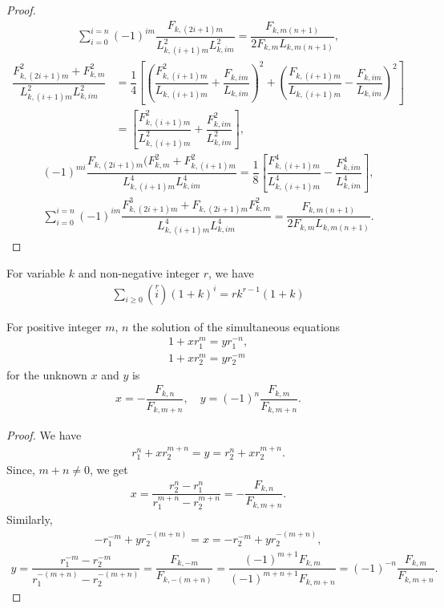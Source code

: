 \begin{proof}
\begin{align*}
   \sum_{i=0}^{i=n}(-1)^{im}\dfrac{F_{k,(2i+1)m}}{L_{k,(i+1)m}^2 L_{k,im}^2} = \dfrac{F_{k,m(n+1)}}{2F_{k,m}L_{k,m(n+1)}},
 \end{align*} 
\begin{align*}
\dfrac{F_{k,(2i+1)m}^2+F_{k,m}^2}{L_{k,(i+1)m}^2L_{k,im}^2} &= \dfrac{1}{4}\left[(\dfrac{F_{k,(i+1)m}^2}{L_{k,(i+1)m}} + \dfrac{F_{k,im}}{L_{k,im}})^2+(\dfrac{F_{k,(i+1)m}}{L_{k,(i+1)m}} - \dfrac{F_{k,im}}{L_{k,im}})^2  \right] 
\\&=\left[\dfrac{F_{k,(i+1)m}^2}{L_{k,(i+1)m}^2} + \dfrac{F_{k,im}^2}{L_{k,im}^2} \right],
\end{align*}
\begin{align*}
(-1)^{mi}\dfrac{F_{k,(2i+1)m}(F_{k,m}^2+F_{k,(i+1)m}^2}{L_{k,(i+1)m}^4L_{k,im}^4}=\dfrac{1}{8}\left[\dfrac{F_{k,(i+1)m}^4}{L_{k,(i+1)m}^4} - \dfrac{F_{k,im}^4}{L_{k,im}^4}  \right], 
\end{align*}
\begin{align*}
   \sum_{i=0}^{i=n}(-1)^{im}\dfrac{F_{k,(2i+1)m}^3+ F_{k,(2i+1)m}F_{k,m}^2}{L_{k,(i+1)m}^4 L_{k,im}^4} = \dfrac{F_{k,m(n+1)}}{2F_{k,m}L_{k,m(n+1)}}.
 \end{align*} 
 \end{proof}
\begin{lemma}
For variable $k$ and non-negative integer $r$, we have
\begin{align}
\sum_{i \geq 0}\left(\stackrel{r}{i}\right)(1+k)^i=r k^{r-1}(1+k) 
\end{align}
\end{lemma}
\begin{lemma}
For positive integer $m$, $n$ the solution of the simultaneous equations 
\begin{align*}
1+ xr_1 ^m = y r_1 ^{-n},\\
1+xr_2 ^m = yr_2  ^{-m}
\end{align*}
for the unknown $x$ and $y$ is
\begin{align*}
x = -\dfrac{F_{k,n}}{F_{k, m+n}},\quad  y = (-1)^n \dfrac{F_{k,m}}{F_{k,m+n}}.
\end{align*}
\end{lemma}\label{aaa}
\begin{proof} We have
\begin{align*}
r_1^n+x  r_2^{m+n} = y = r_2^n+x r_2^{m+n}.
\end{align*}
Since, $m+n \neq 0$, we get
\begin{align*}
x = \dfrac{r_2^n - r_1^n }{r_1^{m+n}- r_2^{m+n}} = - \dfrac{F_{k,n}}{F_{k, m+n}}.
\end{align*}
Similarly,
\begin{align*}
- r_1^{-m} +y r_2^{-(m+n)} = x = - r_2^{-m}+ y r_2^{-(m+n)}, 
\end{align*}
\begin{align*}
y = \dfrac{r_1^{-m}-  r_2^{-m}}{r_1^{-(m+n)}- r_2^{-(m+n)}}= \dfrac{F_{k, -m}}{F_{k, -(m+n)}}
= \dfrac{(-1)^{m+1}F_{k, m}}{(-1)^{m+n+1}F_{k, m+n}}
= (-1)^ {-n}\dfrac{F_{k, m}}{F_{k, m+n}}. 
\end{align*}
\end{proof}
